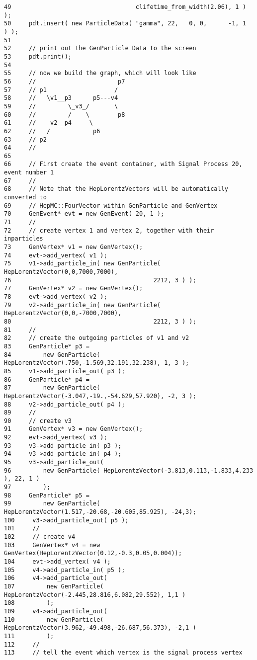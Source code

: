 \begin{DocInclude}
\begin{verbatim}
49                                   clifetime_from_width(2.06), 1 )    );
50     pdt.insert( new ParticleData( "gamma", 22,   0, 0,      -1, 1  ) );
51 
52     // print out the GenParticle Data to the screen
53     pdt.print();
54 
55     // now we build the graph, which will look like
56     //                       p7
57     // p1                   /
58     //   \v1__p3      p5---v4
59     //         \_v3_/       \ 
60     //         /    \        p8
61     //    v2__p4     \ 
62     //   /            p6
63     // p2
64     //
65 
66     // First create the event container, with Signal Process 20, event number 1
67     //
68     // Note that the HepLorentzVectors will be automatically converted to 
69     // HepMC::FourVector within GenParticle and GenVertex
70     GenEvent* evt = new GenEvent( 20, 1 );
71     //
72     // create vertex 1 and vertex 2, together with their inparticles
73     GenVertex* v1 = new GenVertex();
74     evt->add_vertex( v1 );
75     v1->add_particle_in( new GenParticle( HepLorentzVector(0,0,7000,7000),
76                                        2212, 3 ) );
77     GenVertex* v2 = new GenVertex();
78     evt->add_vertex( v2 );
79     v2->add_particle_in( new GenParticle( HepLorentzVector(0,0,-7000,7000),
80                                        2212, 3 ) );
81     //
82     // create the outgoing particles of v1 and v2
83     GenParticle* p3 = 
84         new GenParticle( HepLorentzVector(.750,-1.569,32.191,32.238), 1, 3 );
85     v1->add_particle_out( p3 );
86     GenParticle* p4 = 
87         new GenParticle( HepLorentzVector(-3.047,-19.,-54.629,57.920), -2, 3 );
88     v2->add_particle_out( p4 );
89     //
90     // create v3
91     GenVertex* v3 = new GenVertex();
92     evt->add_vertex( v3 );
93     v3->add_particle_in( p3 );
94     v3->add_particle_in( p4 );
95     v3->add_particle_out( 
96         new GenParticle( HepLorentzVector(-3.813,0.113,-1.833,4.233 ), 22, 1 )
97         );
98     GenParticle* p5 = 
99         new GenParticle( HepLorentzVector(1.517,-20.68,-20.605,85.925), -24,3);
100     v3->add_particle_out( p5 );
101     //
102     // create v4
103     GenVertex* v4 = new GenVertex(HepLorentzVector(0.12,-0.3,0.05,0.004));
104     evt->add_vertex( v4 );
105     v4->add_particle_in( p5 );
106     v4->add_particle_out( 
107         new GenParticle( HepLorentzVector(-2.445,28.816,6.082,29.552), 1,1 )
108         );
109     v4->add_particle_out( 
110         new GenParticle( HepLorentzVector(3.962,-49.498,-26.687,56.373), -2,1 )
111         );
112     //    
113     // tell the event which vertex is the signal process vertex

\end{verbatim}
\end{DocInclude}
